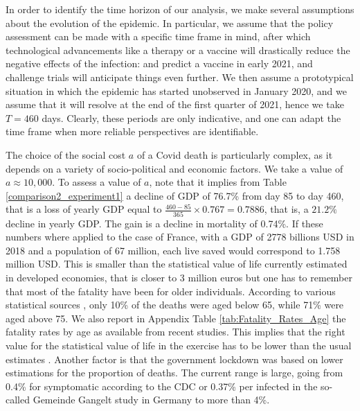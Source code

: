 \documentclass{amsart}
\begin{document}
In order to identify the time horizon of our analysis, we make several assumptions
about the evolution of the epidemic. In particular, we
assume that the policy assessment can be made with a specific
time frame in mind, after which technological advancements
like a therapy or a vaccine  will drastically reduce
the negative effects of the infection:  \cite{HHS}
and \cite{TT} predict a vaccine in early 2021,
and challenge trials will anticipate things even further.
 We then assume a prototypical
situation in which 
the epidemic has started unobserved in January 2020,
and we assume that it 
 will resolve at the end of the first quarter of 2021,
 hence we
take $T=460$ days.
Clearly, these periods are only indicative, and 
one can adapt the time frame when more reliable perspectives
are identifiable.


\vskip 1cm

The choice of the social cost $a$ of a Covid death is
particularly complex, as it depends on a variety of
socio-political and economic factors. 
We take a value of $a\approx 10,000$.
To assess a value of $a$, note that it implies from Table \ref{comparison2_experiment1} a decline of GDP of 76.7\% from day 85 to day 460, that is a loss of yearly GDP equal to $\frac{460-85}{365}\times 0.767=0.7886$, that is, a $21.2\%$ decline in yearly GDP. The gain is a decline in mortality of 0.74\%. If these numbers where applied to the case of France, with a GDP of 2778 billions USD in 2018 and a population of 67 million, each live saved would correspond to 1.758 million USD.  This is smaller than the statistical value of life currently estimated in developed economies, that is closer to 3 million euros \cite{baumstark2013elements} but one has to remember that most of the fatality have been for older individuals. According to various statistical sources \cite{Stat2020}, only 10\% of the deaths were aged below 65, while 71\% were aged above 75. We also report in Appendix Table \ref{tab:Fatality_Rates_Age} the fatality rates by age as available from recent studies. This implies that the right value for the statistical value of life in the exercise has to be lower than the usual estimates
\cite{Zenioetal}. Another factor is that the government lockdown was based on lower estimations for the proportion of deaths. The current range is large, going from 0.4\% for symptomatic according to the CDC or 0.37\% per infected in the so-called Gemeinde Gangelt study in Germany \cite{streeck2020vorlaufiges} to more than 4\%.  \color{black}
\end{document}
